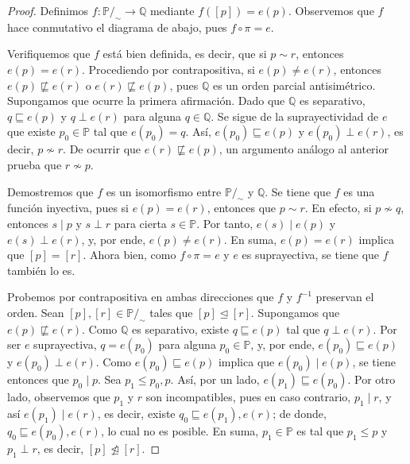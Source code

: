 \documentclass[11pt]{unam_tesis1}
\theoremstyle{MyThmStyle}
\theoremstyle{definition}
\theoremstyle{plain}
\theoremstyle{remark}
\let\leq\leqslant
\begin{document}
\begin{proof}
Definimos $f:\mathbb P/_\sim \to \mathbb Q$ mediante $f([p])=e(p)$. Observemos que $f$ hace conmutativo el diagrama de abajo, pues $f \circ \pi=e$.

Verifiquemos que $f$ est\'a bien definida, es decir, que si $p\sim r$, entonces $e(p)=e(r)$. Procediendo por contrapositiva, si $e(p)\neq e(r)$, entonces $e(p)\not\sqsubseteq e(r)$ o $e(r)\not\sqsubseteq e(p)$, pues $\mathbb Q$ es un orden parcial antisim\'etrico. Supongamos que ocurre la primera afirmaci\'on. Dado que $\mathbb Q$ es separativo, $q\sqsubseteq e(p)$ y $q\perp e(r)$ para alguna $q\in \mathbb Q$. Se sigue de la suprayectividad de $e$ que existe $p_0\in \mathbb P$ tal que $e(p_0)=q$. As\'i, $e(p_0)\sqsubseteq e(p)$ y $e(p_0)\perp e(r)$, es decir, $p\not\sim r$. De ocurrir que $e(r)\not\sqsubseteq e(p)$, un argumento an\'alogo al anterior prueba que $r\not\sim p$.

\begin{center}
\end{center}

Demostremos que $f$ es un isomorfismo entre $\mathbb P/_\sim$ y $\mathbb Q$. Se tiene que $f$ es una funci\'on inyectiva, pues si $e(p)=e(r)$, entonces que $p\sim r$. En efecto, si $p\not\sim q$, entonces $s\mid p$ y $s\perp r$ para cierta $s\in \mathbb P$. Por tanto, $e(s)\mid e(p)$ y $e(s)\perp e(r)$, y, por ende, $e(p)\neq e(r)$. En suma, $e(p)=e(r)$ implica que $[p]=[r]$. Ahora bien, como $f\circ\pi=e$ y $e$ es suprayectiva, se tiene que $f$ tambi\'en lo es.

Probemos por contrapositiva en ambas direcciones que $f$ y $f^{-1}$ preservan el orden. Sean $[p],[r]\in \mathbb P/_\sim$ tales que $[p]\trianglelefteq [r]$. Supongamos que $e(p) \not\sqsubseteq e(r)$. Como $\mathbb Q$ es separativo, existe $q\sqsubseteq e(p)$ tal que $q\perp e(r)$. Por ser $e$ suprayectiva, $q=e(p_0)$ para alguna $p_0\in \mathbb P$, y, por ende, $e(p_0)\sqsubseteq e(p)$ y $e(p_0)\perp e(r)$. Como $e(p_0)\sqsubseteq e(p)$ implica que $e(p_0)\mid e(p)$, se tiene entonces que $p_0\mid p$. Sea $p_1\leq p_0,p$. As\'i, por un lado, $e(p_1)\sqsubseteq e(p_0)$. Por otro lado, observemos que $p_1$ y $r$ son incompatibles, pues en caso contrario, $p_1\mid r$, y as\'i $e(p_1)\mid e(r)$, es decir, existe $q_0\sqsubseteq e(p_1),e(r)$; de donde, $q_0\sqsubseteq e(p_0),e(r)$, lo cual no es posible. En suma, $p_1\in \mathbb P$ es tal que $p_1\leq p$ y $p_1\perp r$, es decir, $[p]\ntrianglelefteq [r]$.


\end{proof}
\end{document}
